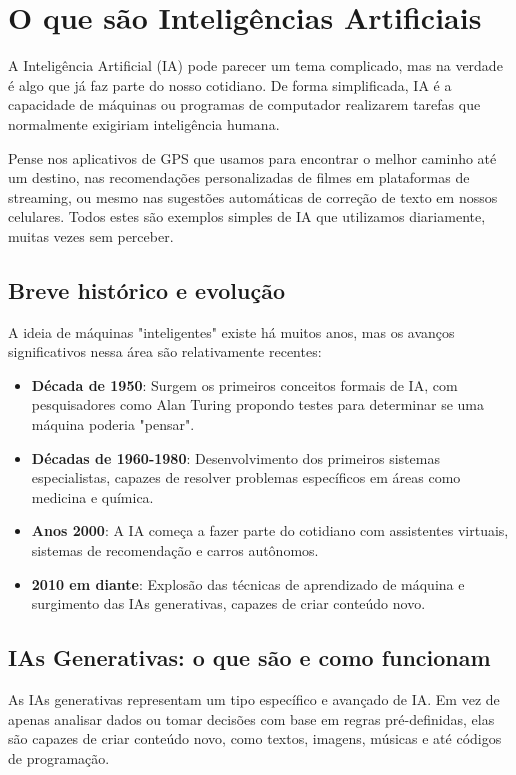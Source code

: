\documentclass[12pt,a4paper]{book}
\begin{document}
\section{O que são Inteligências Artificiais}

A Inteligência Artificial (IA) pode parecer um tema complicado, mas na verdade é algo que já faz parte do nosso cotidiano. De forma simplificada, IA é a capacidade de máquinas ou programas de computador realizarem tarefas que normalmente exigiriam inteligência humana.

Pense nos aplicativos de GPS que usamos para encontrar o melhor caminho até um destino, nas recomendações personalizadas de filmes em plataformas de streaming, ou mesmo nas sugestões automáticas de correção de texto em nossos celulares. Todos estes são exemplos simples de IA que utilizamos diariamente, muitas vezes sem perceber.

\subsection{Breve histórico e evolução}

A ideia de máquinas "inteligentes" existe há muitos anos, mas os avanços significativos nessa área são relativamente recentes:

\begin{itemize}
    \item \textbf{Década de 1950}: Surgem os primeiros conceitos formais de IA, com pesquisadores como Alan Turing propondo testes para determinar se uma máquina poderia "pensar".
    \item \textbf{Décadas de 1960-1980}: Desenvolvimento dos primeiros sistemas especialistas, capazes de resolver problemas específicos em áreas como medicina e química.
    \item \textbf{Anos 2000}: A IA começa a fazer parte do cotidiano com assistentes virtuais, sistemas de recomendação e carros autônomos.
    \item \textbf{2010 em diante}: Explosão das técnicas de aprendizado de máquina e surgimento das IAs generativas, capazes de criar conteúdo novo.
\end{itemize}

\subsection{IAs Generativas: o que são e como funcionam}

As IAs generativas representam um tipo específico e avançado de IA. Em vez de apenas analisar dados ou tomar decisões com base em regras pré-definidas, elas são capazes de criar conteúdo novo, como textos, imagens, músicas e até códigos de programação.
\end{document}
